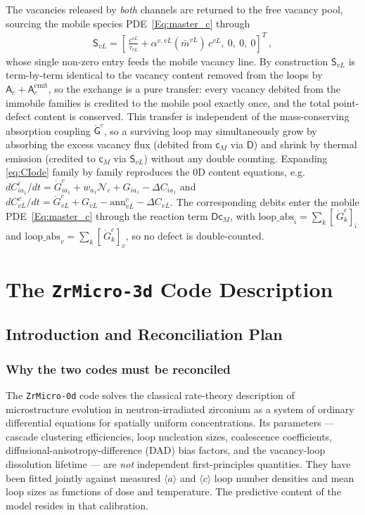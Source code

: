 \documentclass{article}
\newcommand{\spvec}[1]{\bm{\mathsf{#1}}}   %
\newcommand{\spmat}[1]{\bm{\mathsf{#1}}}   %
\newcommand{\aloop}{\ensuremath{\langle a\rangle}}
\newcommand{\cloop}{\ensuremath{\langle c\rangle}}
\newcommand{\ZrM}{\texttt{ZrMicro-3d}}
\newcommand{\ZrOd}{\texttt{ZrMicro-0d}}
\begin{document}
The vacancies released by \emph{both} channels are returned to the free vacancy pool, sourcing the mobile species PDE~\eqref{Eq:master_c} through
\begin{align}\label{eq:Semit}
\spvec{S}_{vL}=\left[\,\frac{c^{vL}}{\tau_{vL}}+\alpha^{v,vL}(\bar m^{vL})\,c^{vL},\ 0,\ 0,\ 0\right]^T\, ,
\end{align}
whose single non-zero entry feeds the mobile vacancy line. By construction $\spvec{S}_{vL}$ is term-by-term identical to the vacancy content removed from the loops by $\spvec{A}_c+\spvec{A}_c^{\mathrm{emit}}$, so the exchange is a pure transfer: every vacancy debited from the immobile families is credited to the mobile pool exactly once, and the total point-defect content is conserved. This transfer is independent of the mass-conserving absorption coupling $\dot{\spvec{G}}^{c}$, so a surviving loop may simultaneously grow by absorbing the excess vacancy flux (debited from $\spvec{c}_M$ via $\spmat{D}$) and shrink by thermal emission (credited to $\spvec{c}_M$ via $\spvec{S}_{vL}$) without any double counting.
Expanding \eqref{eq:CIode} family by family reproduces the $0$D content equations, e.g. $dC_{ia_1}^{i}/dt=\dot G^{c}_{ia_1}+w_{a_1}\mathcal{N}_c+G_{ia_1}-\Delta C_{ia_1}$ and $dC_{vL}^{v}/dt=\dot G^{c}_{vL}+G_{vL}-\mathrm{ann}^{c}_{vL}-\Delta C_{vL}$. The corresponding debits enter the mobile PDE~\eqref{Eq:master_c} through the reaction term $\spmat{D}\spvec{c}_M$, with $\text{loop\_abs}_i=\sum_k[\,\dot G^{c}_k]_i$ and $\text{loop\_abs}_v=\sum_k[\,\dot G^{c}_k]_v$, so no defect is double-counted.

\section{The {\ZrM} Code Description}
\label{sec:zr3d_ghoniem}

\subsection{Introduction and Reconciliation Plan}
\label{sec:intro}

\subsubsection{Why the two codes must be reconciled}

The \ZrOd{} code solves the classical rate-theory description of microstructure
evolution in neutron-irradiated zirconium as a system of ordinary differential
equations for spatially uniform concentrations. Its parameters — cascade
clustering efficiencies, loop nucleation sizes, coalescence coefficients,
diffusional-anisotropy-difference (DAD) bias factors, and the vacancy-loop
dissolution lifetime — are \emph{not} independent first-principles quantities.
They have been fitted jointly against measured \aloop{} and \cloop{} loop
number densities and mean loop sizes as functions of dose and temperature. The
predictive content of the model resides in that calibration.
\end{document}
